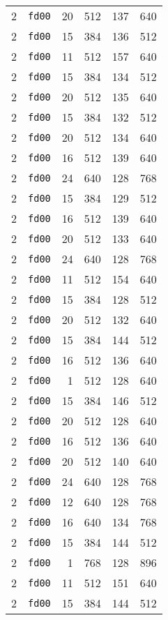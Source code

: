 \documentclass{article}
\begin{document}
\begin{table}[h!]
\begin{tabular}{llrrrl}
    2 & \texttt{fd00} & 20 & 512 & 137 & 640 \\
    2 & \texttt{fd00} & 15 & 384 & 136 & 512 \\
    2 & \texttt{fd00} & 11 & 512 & 157 & 640 \\
    2 & \texttt{fd00} & 15 & 384 & 134 & 512 \\
    2 & \texttt{fd00} & 20 & 512 & 135 & 640 \\
    2 & \texttt{fd00} & 15 & 384 & 132 & 512 \\
    2 & \texttt{fd00} & 20 & 512 & 134 & 640 \\
    2 & \texttt{fd00} & 16 & 512 & 139 & 640 \\
    2 & \texttt{fd00} & 24 & 640 & 128 & 768 \\
    2 & \texttt{fd00} & 15 & 384 & 129 & 512 \\
    2 & \texttt{fd00} & 16 & 512 & 139 & 640 \\
    2 & \texttt{fd00} & 20 & 512 & 133 & 640 \\
    2 & \texttt{fd00} & 24 & 640 & 128 & 768 \\
    2 & \texttt{fd00} & 11 & 512 & 154 & 640 \\
    2 & \texttt{fd00} & 15 & 384 & 128 & 512 \\
    2 & \texttt{fd00} & 20 & 512 & 132 & 640 \\
    2 & \texttt{fd00} & 15 & 384 & 144 & 512 \\
    2 & \texttt{fd00} & 16 & 512 & 136 & 640 \\
    2 & \texttt{fd00} & 1 & 512 & 128 & 640 \\
    2 & \texttt{fd00} & 15 & 384 & 146 & 512 \\
    2 & \texttt{fd00} & 20 & 512 & 128 & 640 \\
    2 & \texttt{fd00} & 16 & 512 & 136 & 640 \\
    2 & \texttt{fd00} & 20 & 512 & 140 & 640 \\
    2 & \texttt{fd00} & 24 & 640 & 128 & 768 \\
    2 & \texttt{fd00} & 12 & 640 & 128 & 768 \\
    2 & \texttt{fd00} & 16 & 640 & 134 & 768 \\
    2 & \texttt{fd00} & 15 & 384 & 144 & 512 \\
    2 & \texttt{fd00} & 1 & 768 & 128 & 896 \\
    2 & \texttt{fd00} & 11 & 512 & 151 & 640 \\
    2 & \texttt{fd00} & 15 & 384 & 144 & 512 \\

\end{tabular}
\end{table}
\end{document}
